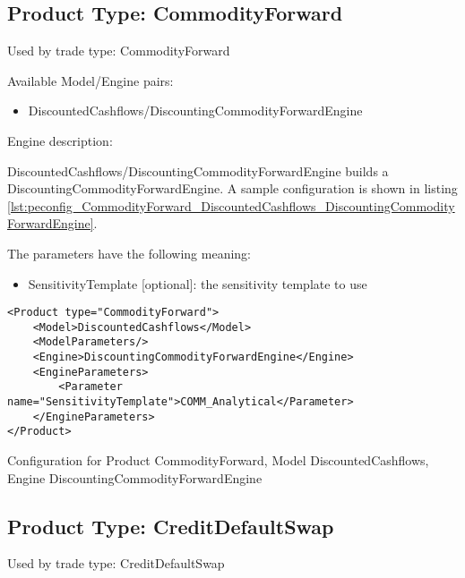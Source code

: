 \subsection{Product Type: CommodityForward}

Used by trade type: CommodityForward

Available Model/Engine pairs:

\begin{itemize}
\item DiscountedCashflows/DiscountingCommodityForwardEngine
\end{itemize}

Engine description:

DiscountedCashflows/DiscountingCommodityForwardEngine builds a DiscountingCommodityForwardEngine. A sample configuration is shown in listing
\ref{lst:peconfig_CommodityForward_DiscountedCashflows_DiscountingCommodityForwardEngine}.

The parameters have the following meaning:

\begin{itemize}
\item SensitivityTemplate [optional]: the sensitivity template to use 
\end{itemize}

\begin{longlisting}
\begin{verbatim}
<Product type="CommodityForward">
    <Model>DiscountedCashflows</Model>
    <ModelParameters/>
    <Engine>DiscountingCommodityForwardEngine</Engine>
    <EngineParameters>
        <Parameter name="SensitivityTemplate">COMM_Analytical</Parameter>
    </EngineParameters>
</Product>
\end{verbatim}
\caption{Configuration for Product CommodityForward, Model DiscountedCashflows, Engine DiscountingCommodityForwardEngine}
\label{lst:peconfig_CommodityForward_DiscountedCashflows_DiscountingCommodityForwardEngine}
\end{longlisting}

\subsection{Product Type: CreditDefaultSwap}

Used by trade type: CreditDefaultSwap

